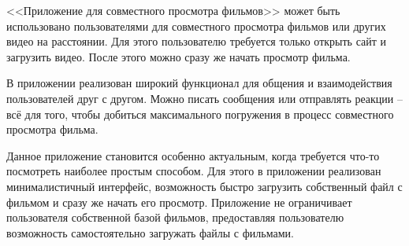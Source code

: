 <<Приложение для совместного просмотра фильмов>> может быть использовано пользователями для совместного просмотра фильмов или других видео на расстоянии.
Для этого пользователю требуется только открыть сайт и загрузить видео.
После этого можно сразу же начать просмотр фильма.

В приложении реализован широкий функционал для общения и взаимодействия пользователей друг с другом.
Можно писать сообщения или отправлять реакции -- всё для того, чтобы добиться максимального погружения в процесс совместного просмотра фильма.

Данное приложение становится особенно актуальным, когда требуется что-то посмотреть наиболее простым способом.
Для этого в приложении реализован минималистичный интерфейс, возможность быстро загрузить собственный файл с фильмом и сразу же начать его просмотр.
Приложение не ограничивает пользователя собственной базой фильмов, предоставляя пользователю возможность самостоятельно загружать файлы с фильмами.